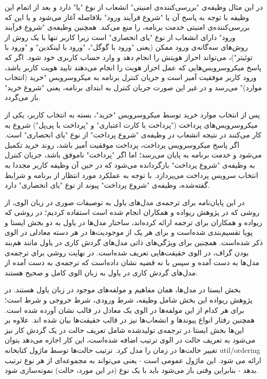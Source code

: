در این مثال وظیفه‌ی "بررسی‌کننده‌ی امنیتی" انشعاب از نوع "یا" دارد و بعد از اتمام این وظیفه با توجه به پاسخ آن یا "شروع فرآیند ورود" بلافاصله آغاز می‌شود و یا این که بررسی‌کننده‌ی امنیتی خدمت برنامه، را منع می‌کند. همچنین وظیفه‌ی "شروع فرآیند ورود" دارای انشعاب از نوع "یای انحصاری" است زیرا کاربر تنها با یک روش از روش‌های سه‌گانه‌ی ورود ممکن (یعنی "ورود با گوگل"، "ورود با لینکدین" و "ورود با توئیتر")، می‌تواند احراز هویتش را انجام دهد و وارد حساب کاربری خود شود. اگر که پاسخ میکروسرویس‌هایی که عمل احراز هویت را انجام می‌دهند تایید هویت کاربر باشد، ورود کاربر موفقیت آمیز است و جریان کنترل برنامه به میکروسرویس "خرید (انتخاب موارد)" می‌رسد و در غیر این صورت جریان کنترل به ابتدای برنامه، یعنی "شروع خرید" باز می‌گردد.

پس از انتخاب موارد خرید توسط میکروسرویس "خرید"، بسته به انتخاب کاربر، یکی از میکروسرویس‌های پرداخت ("پرداخت با کارت اعتباری" و "پرداخت با پی‌پل") شروع به کار می‌کنند در نتیجه انشعاب در وظیفه‌ی "شروع پرداخت" از نوع "یای انحصاری" است. اگر پاسخ میکروسرویس‌ پرداخت، پرداخت موفقیت آمیز باشد، روند خرید تکمیل می‌شود و خدمت برنامه به پایان می‌رسد؛ اما اگر "پرداخت" ناموفق باشد، جریان کنترل به وظیفه‌ی "شروع پرداخت" بازگردانده می‌شود که در حین آن وظیفه کاربر مجددا به انتخاب سرویس پرداخت می‌پردازد. با توجه به عملکرد مورد انتظار از برنامه و شرایط گفته‌شده، وظیفه‌ی "شروع پرداخت" پیوند از نوع "یای انحصاری" دارد. 

  
  
در این پایان‌نامه برای ترجمه‌ی مدل‌های یاول به توصیفات صوری در زبان الوی، از روشی که در پژوهش ریواده و همکاران انجام شده است استفاده کردیم؛
 در روشی که ریواده و همکاران برای ترجمه ارائه کرده‌اند، ساختار مدل‌ها در یاول به دو بخش ایستا و پویا تقسیم‌بندی شده‌است و برای هر یک از موجودیت‌ها در هر دسته معادلی در الوی ذکر شده‌است. 
 همچنین برای ویژگی‌های ذاتی مدل‌های گردش کاری در یاول مانند هم‌بند بودن گراف، در الوی حقیقت‌هایی تعریف شده‌است.
  در نهایت روشی برای ترجمه‌ی مدل‌ها به دست آمده و سپس با نه قضیه نشان داده‌است که ترجمه‌ی به دست آمده از مدل‌های گردش کاری در یاول به زبان الوی کامل و صحیح هستند.
  
بخش ایستا در مدل‌ها، همان مفاهیم و مولفه‌های موجود در زبان یاول هستند. در پژوهش ریواده این بخش شامل وظیفه، شرط ورودی، شرط خروجی و شرط است؛ 
برای هر کدام از این مولفه‌ها در الوی یک معادل در قالب نشان آورده شده است. همچنین رفتار انواع پیوندها و انشعاب‌ها نیز در قالب حقیقت‌ها بیان شده اند. 
علاوه بر این‌ها بخش ایستا در ترجمه‌ی تولید‌شده شامل تعریف حالت در یک گردش کار نیز می‌شود به تعریف حالت در الوی ترتیب اضافه شده‌است، 
این کار اجازه می‌دهد بتوان تغییر حالت‌ها در زمان را مدل کرد. ترتیب حالت‌ها توسط ماژول کتابخانه util/ordering ارائه می شود. این ماژول عمومی است - یعنی می‌تواند به مجموعه‌ای از هر نوع ترتیب بدهد - بنابراین وقتی باز می‌شود باید با یک نوع (در این مورد، حالت) نمونه‌سازی شود.

